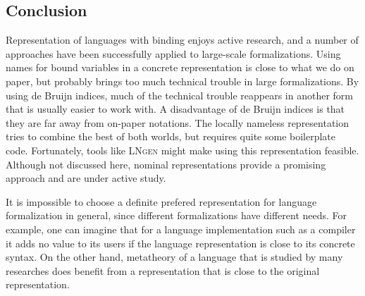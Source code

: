 \documentclass[a4paper,11pt]{article}
\newcommand{\name}[1]{\textsc{#1}\xspace}
\def\LNgen{\name{LNgen}}
\begin{document}
\subsection{Conclusion}

Representation of languages with binding enjoys active research, and a
number of approaches have been successfully applied to large-scale
formalizations.
Using names for bound variables in a concrete representation is close
to what we do on paper, but probably brings too much technical
trouble in large formalizations.
By using de Bruijn indices, much of the technical trouble reappears
in another form that is usually easier to work with.
A disadvantage of de Bruijn indices is that they are far away from
on-paper notations.
The locally nameless representation tries to combine the best of both
worlds, but requires quite some boilerplate code. Fortunately, tools
like \LNgen might make using this representation feasible. Although
not discussed here, nominal representations provide a promising
approach and are under active study.

It is impossible to choose a definite prefered representation for
language formalization in general, since different formalizations have
different needs. For example, one can imagine that for a language
implementation such as a compiler it adds no value to its users if the
language representation is close to its concrete syntax. On the other
hand, metatheory of a language that is studied by many researches does
benefit from a representation that is close to the original
representation.



\nocite{*} %


\end{document}
